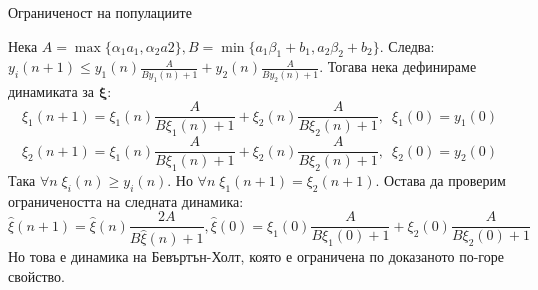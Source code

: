 \begin{frame}[t]{Ограниченост на популациите}

Нека $A=\max \{\alpha_{1} a_{1},\alpha_{2} a{2}\}, B=\min \{a_{1} \beta_{1} + b_{1},a_{2} \beta_{2} + b_{2}\}$. Следва:
$y_{i}(n+1) \leq y_{1}(n) \frac{A}{B y_{1}(n) + 1} + y_{2}(n) \frac{A}{B y_{2}(n) + 1}$. Тогава нека дефинираме динамиката за $\boldsymbol{\xi}$:
\[\xi_{1}(n+1) = \xi_{1}(n) \frac{A}{B \xi_{1}(n) + 1} + \xi_{2}(n) \frac{A}{B \xi_{2}(n) + 1}, \enspace \xi_{1}(0)=y_{1}(0)\]
\[\xi_{2}(n+1) = \xi_{1}(n) \frac{A}{B \xi_{1}(n) + 1} + \xi_{2}(n) \frac{A}{B \xi_{2}(n) + 1}, \enspace \xi_{2}(0)=y_{2}(0)\]
Така $\forall{n} \; \xi_{i}(n) \geq y_{i}(n)$. Но $\forall{n} \; \xi_{1}(n+1)=\xi_{2}(n+1)$. Остава да проверим ограничеността на следната динамика:
\[\hat{\xi}(n+1) = \hat{\xi}(n) \frac{2 A}{B \hat{\xi}(n) + 1}, \hat{\xi}(0)=\xi_{1}(0) \frac{A}{B \xi_{1}(0) + 1} + \xi_{2}(0) \frac{A}{B \xi_{2}(0) + 1}\]
Но това е динамика на Бевъртън-Холт, която е ограничена по доказаното по-горе свойство.

\end{frame}

